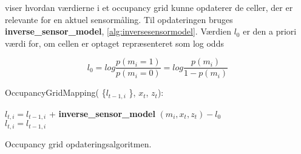  viser hvordan værdierne i et occupancy grid kunne opdaterer de celler, der er relevante for en aktuel sensormåling. 
Til opdateringen bruges \textbf{inverse\_sensor\_model}, \cref{alg:inversesensormodel}.
Værdien $ l_0 $ er den a priori værdi for, om cellen er optaget repræsenteret som log odds

\begin{equation}
  l_0 =  log \frac{p(m_i = 1)}{p(m_i = 0)} = log \frac{p(m_i)}{1- p(m_i)}
\end{equation} 

\begin{algorithm}[H]
\LinesNumbered
OccupancyGridMapping( \{$ l_{t-1,i} $ \}, $ x_t $, $ z_t $):

{
{ $ l_{t,i} = l_{t-1,i} $ + \textbf{inverse\_sensor\_model} $( m_i, x_t, z_t ) - l_0$\\ }
{ $ l_{t,i} = l_{t-1,i}  $\\ }
}
\caption{Occupancy grid opdateringsalgoritmen.}\label{occupancygrid:alg}
\end{algorithm}




